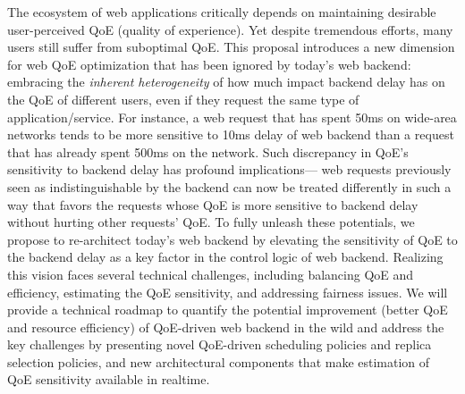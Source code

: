 The ecosystem of web applications critically depends on maintaining desirable user-perceived QoE (quality of experience).
Yet despite tremendous efforts,
many users still suffer from suboptimal QoE.
This proposal introduces a new dimension for web QoE optimization that has been ignored by today's web backend: embracing the {\em inherent heterogeneity} of how much impact backend delay has on the QoE of different users, even if they request the same type of application/service.
For instance, a web request that has spent 50ms on wide-area networks tends to be more sensitive to 10ms delay of web backend than a request that has already spent 500ms on the network. 
Such discrepancy in QoE's sensitivity to backend delay has profound implications---
web requests previously seen as indistinguishable by the backend can now be treated differently in such a way that favors the requests whose QoE is more sensitive to backend delay without hurting other requests' QoE. 
To fully unleash these potentials, we propose to re-architect today's web backend by elevating the sensitivity of QoE to the backend delay as a key factor in the control logic of web backend.
Realizing this vision faces several technical challenges, including balancing QoE and efficiency, estimating the QoE sensitivity, and addressing fairness issues.
We will provide a technical roadmap to quantify the potential improvement (better QoE and resource efficiency) of QoE-driven web backend in the wild and address the key challenges by presenting novel QoE-driven scheduling policies and replica selection policies, and new architectural components that make estimation of QoE sensitivity available in realtime.

